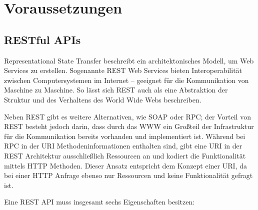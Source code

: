\chapter{Voraussetzungen}

	
	\section{RESTful APIs} %
	
		Representational State Transfer beschreibt ein architektonisches Modell, um Web Services zu erstellen. Sogenannte REST Web Services bieten Interoperabilität zwischen Computersystemen im Internet -- geeignet für die Kommunikation von Maschine zu Maschine. So lässt sich REST auch als eine Abstraktion der Struktur und des Verhaltens des World Wide Webs beschreiben. 
		
		Neben REST gibt es weitere Alternativen, wie SOAP oder RPC; der Vorteil von REST besteht jedoch darin, dass durch das WWW ein Großteil der Infrastruktur für die Kommunikation bereits vorhanden und implementiert ist. Während bei RPC in der URI Methodeninformationen enthalten sind, gibt eine URI in der REST Architektur ausschließlich Ressourcen an und kodiert die Funktionalität mittels HTTP Methoden. Dieser Ansatz entspricht dem Konzept einer URI, da bei einer HTTP Anfrage ebenso nur Ressourcen und keine Funktionalität gefragt ist.
		
		Eine REST API muss insgesamt sechs Eigenschaften besitzen:
		
